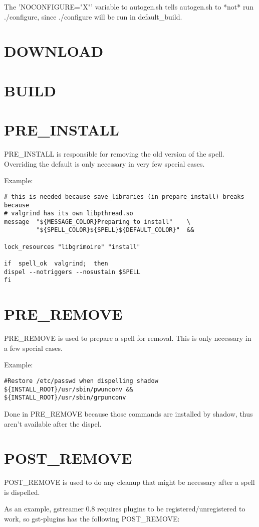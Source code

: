 \documentclass[a4paper,10pt]{book}
\begin{document}
The 'NOCONFIGURE="X"' variable to autogen.sh tells autogen.sh to *not* run
./configure, since ./configure will be run in default\_build.

\section{DOWNLOAD}

\section{BUILD}
\section{PRE\_INSTALL}
PRE\_INSTALL is responsible for removing the old version of the spell.
Overriding the default is only necessary in very few special cases.

Example:
\begin{verbatim}
# this is needed because save_libraries (in prepare_install) breaks because
# valgrind has its own libpthread.so
message  "${MESSAGE_COLOR}Preparing to install"    \
         "${SPELL_COLOR}${SPELL}${DEFAULT_COLOR}"  &&

lock_resources "libgrimoire" "install"

if  spell_ok  valgrind;  then
dispel --notriggers --nosustain $SPELL
fi
\end{verbatim}

\section{PRE\_REMOVE}
PRE\_REMOVE is used to prepare a spell for removal. This is only necessary in a
few special cases.

Example:
\begin{verbatim}
#Restore /etc/passwd when dispelling shadow
${INSTALL_ROOT}/usr/sbin/pwunconv &&
${INSTALL_ROOT}/usr/sbin/grpunconv
\end{verbatim}

Done in PRE\_REMOVE because those commands are installed by shadow, thus aren't
available after the dispel.

\section{POST\_REMOVE}
POST\_REMOVE is used to do any cleanup that might be necessary after a spell is
dispelled.

As an example, gstreamer 0.8 requires plugins to be registered/unregistered to
work, so gst-plugins has the following POST\_REMOVE:
\end{document}
